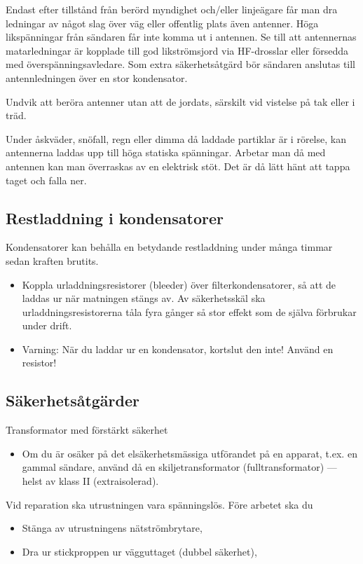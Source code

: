 Endast efter tillstånd från berörd myndighet och/eller linjeägare får
man dra ledningar av något slag över väg eller offentlig plats även
antenner.  Höga likspänningar från sändaren får inte komma ut i
antennen. Se till att antennernas matarledningar är kopplade till god
likströmsjord via HF-drosslar eller försedda med
överspänningsavledare.  Som extra säkerhetsåtgärd bör sändaren
anslutas till antennledningen över en stor kondensator.

Undvik att beröra antenner utan att de jordats, särskilt vid vistelse
på tak eller i träd.

Under åskväder, snöfall, regn eller dimma då laddade partiklar är i
rörelse, kan antennerna laddas upp till höga statiska
spänningar. Arbetar man då med antennen kan man överraskas av en
elektrisk stöt. Det är då lätt hänt att tappa taget och falla ner.

\subsection{Restladdning i kondensatorer}

Kondensatorer kan behålla en betydande restladdning under många timmar
sedan kraften brutits.
\begin{itemize}
\item Koppla urladdningsresistorer (bleeder) över filterkondensatorer,
  så att de laddas ur när matningen stängs av. Av säkerhetsskäl ska
  urladdningsresistorerna tåla fyra gånger så stor effekt som de
  själva förbrukar under drift.
\item Varning: När du laddar ur en kondensator, kortslut den inte! Använd
  en resistor!
\end{itemize}

\subsection{Säkerhetsåtgärder}

Transformator med förstärkt säkerhet
\begin{itemize}
\item Om du är osäker på det elsäkerhetsmässiga utförandet på en
  apparat, t.ex. en gammal sändare, använd då en skiljetransformator
  (fulltransformator) --- helst av klass II (extraisolerad).
\end{itemize}

Vid reparation ska utrustningen vara spänningslös. Före arbetet ska du
\begin{itemize}
\item Stänga av utrustningens nätströmbrytare,
\item Dra ur stickproppen ur vägguttaget (dubbel säkerhet),
\end{itemize}

